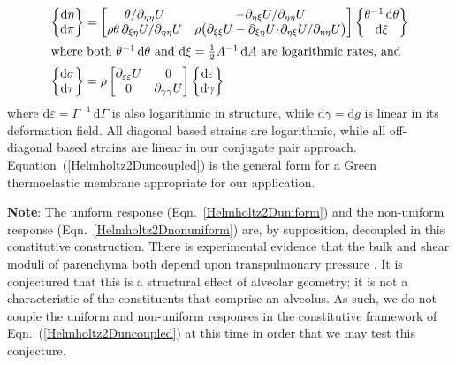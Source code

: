 \begin{subequations}
\label{Helmholtz2Duncoupled}
\begin{align}
\left\{ \begin{matrix}
\mathrm{d} \eta \\ \mathrm{d} \pi 
\end{matrix} \right\} & = \begin{bmatrix}
\theta / \partial_{\eta\eta} U & 
-\partial_{\eta\xi} U / \partial_{\eta\eta} U \\ 
\rho \theta \, \partial_{\xi\eta} U / \partial_{\eta\eta} U & 
\rho \bigl( \partial_{\xi\xi} U - \partial_{\xi\eta} U \!\cdot\! \partial_{\eta\xi} U / \partial_{\eta\eta} U \bigr)  
\end{bmatrix} 
\left\{ \begin{matrix}
\theta^{-1} \, \mathrm{d}\theta \\ \mathrm{d} \xi 
\end{matrix} \right\}
\label{Helmholtz2Duniform} \\
\intertext{where both $\theta^{-1} \, \mathrm{d}\theta$ and $\mathrm{d} \xi = \tfrac{1}{2} A^{-1} \, \mathrm{d}A$ are logarithmic rates, and}
\left\{ \begin{matrix}
    \mathrm{d} \sigma \\ \mathrm{d} \tau
\end{matrix} \right\} & = \rho \begin{bmatrix}
    \partial_{\varepsilon\varepsilon} U & 0 \\
    0 & \partial_{\gamma\gamma} U 
\end{bmatrix} 
\left\{ \begin{matrix}
    \mathrm{d} \varepsilon \\ \mathrm{d} \gamma
\end{matrix} \right\}
\label{Helmholtz2Dnonuniform}
\end{align} 
\end{subequations}
where $\mathrm{d} \varepsilon = \Gamma^{-1} \, \mathrm{d} \Gamma$ is also logarithmic in structure, while $\mathrm{d} \gamma = \mathrm{d} g$ is linear in its deformation field.  All diagonal based strains are logarithmic, while all off-diagonal based strains are linear in our conjugate pair approach.  Equation~(\ref{Helmholtz2Duncoupled}) is the general form for a Green thermo\-elastic membrane appropriate for our application.

\medskip\noindent
\textbf{Note}:  The uniform response (Eqn.~\ref{Helmholtz2Duniform}) and the non-uniform response (Eqn.~\ref{Helmholtz2Dnonuniform}) are, by supposition, decoupled in this constitutive construction.  There is experimental evidence that the bulk and shear moduli of parenchyma both depend upon transpulmonary pressure \cite{LaiFook79,Jahedetal90}.  It is conjectured that this is a structural effect of alveolar geometry; it is not a characteristic of the constituents that comprise an alveolus.  As such, we do not couple the uniform and non-uniform responses in the constitutive framework of Eqn.~(\ref{Helmholtz2Duncoupled}) at this time in order that we may test this conjecture.

